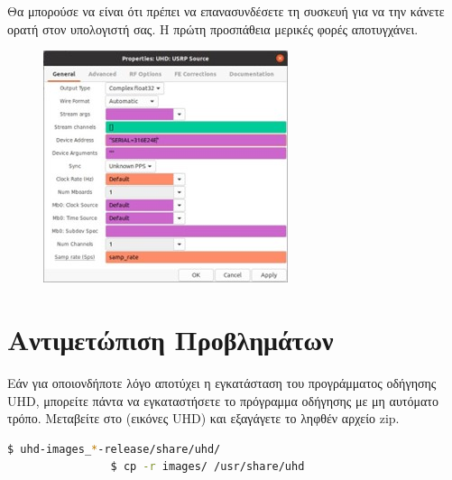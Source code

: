 \documentclass[12pt]{report}
\begin{document}
            Θα μπορούσε να είναι ότι πρέπει να επανασυνδέσετε τη συσκευή για να την κάνετε ορατή στον
            υπολογιστή σας. Η πρώτη προσπάθεια μερικές φορές αποτυγχάνει.
            \begin{figure}[h]
                \centering
                \includegraphics[width=.5\textwidth]{grc_success.jpg}
                \caption{}
                \label{fig:grcSucc}
            \end{figure}
        
        \section*{\textsf{Αντιμετώπιση Προβλημάτων}}
            Εάν για οποιονδήποτε λόγο αποτύχει η εγκατάσταση του προγράμματος οδήγησης UHD, 
            μπορείτε πάντα να εγκαταστήσετε το πρόγραμμα οδήγησης με μη αυτόματο τρόπο. 
            Μεταβείτε στο (εικόνες UHD)  και εξαγάγετε το ληφθέν αρχείο zip.
        
            \begin{lstlisting}[language=bash]
                $ uhd-images_*-release/share/uhd/
                $ cp -r images/ /usr/share/uhd
            \end{lstlisting}
\end{document}
